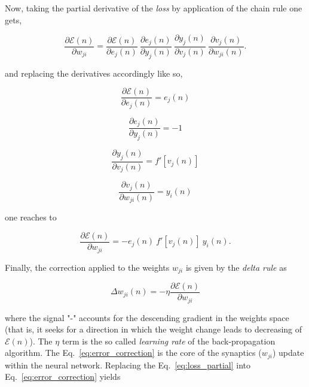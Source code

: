 Now, taking the partial derivative of the \textit{loss} by application of the chain rule one gets,

\begin{equation}
\frac{\partial \mathcal{E}(n)}{\partial w_{ji}} = \frac{\partial \mathcal{E}(n)}{\partial e_{j}(n)} ~ \frac{\partial e_{j}(n)}{\partial y_{j}(n)} ~ \frac{\partial y_{j}(n)}{\partial v_{j}(n)} ~ \frac{\partial v_{j}(n)}{\partial w_{ji}(n)}.
\end{equation}

and replacing the derivatives accordingly like so,

\begin{equation}
\frac{\partial \mathcal{E}(n)}{\partial e_{j}(n)} = e_{j}(n)
\end{equation}

\begin{equation}
\label{eq:signal_error_partial}
\frac{\partial e_{j}(n)}{\partial y_{j}(n)} = -1
\end{equation}

\begin{equation}
\frac{\partial y_{j}(n)}{\partial v_{j}(n)} = \mathit{f}'[v_{j}(n)]
\end{equation}

\begin{equation}
\frac{\partial v_{j}(n)}{\partial w_{ji}(n)} = y_{i}(n)
\end{equation}

one reaches to

\begin{equation}
\label{eq:loss_partial}
\frac{\partial \mathcal{E}(n)}{\partial w_{ji}} = -e_{j}(n) ~ \mathit{f}'[v_{j}(n)] ~ y_{i}(n).
\end{equation}

Finally, the correction applied to the weights $w_{ji}$ is given by the \textit{delta rule} as

\begin{equation}
\label{eq:error_correction}
\Delta w_{ji}(n) = - \eta \frac{\partial \mathcal{E}(n)}{\partial w_{ji}}
\end{equation}

where the signal "-" accounts for the descending gradient in the weights space (that is, it seeks for a direction in which the weight change leads to decreasing of $\mathcal{E}(n)$). The $\eta$ term is the so called \textit{learning rate} of the back-propagation algorithm. The Eq.~\ref{eq:error_correction} is the core of the synaptics ($w_{ji}$) update within the neural network. Replacing the Eq.~\ref{eq:loss_partial} into Eq.~\ref{eq:error_correction} yields

